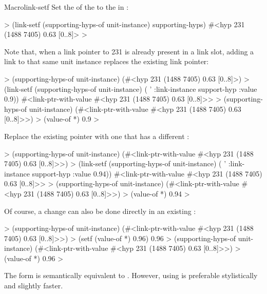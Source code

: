 \documentclass[10pt,twoside,english,pdftex]{article}
\begin{document}
\begin{functiondoc}{Macro}{link-setf}
\fnexamples
%
Set the   of the
  to the  in
:
%
\W\supp
\begin{example}
  > (link-setf (supporting-hyps-of unit-instance) supporting-hyps)
  #<hyp 231 (1488 7405) 0.63 [0..8]>
  >
\end{example}
%
Note that, when a link pointer to  231 is already present in
a link slot, adding a  link to that same  unit instance replaces the existing link pointer:
%
\W\supp\notpretop
\begin{example}
  > (supporting-hyps-of unit-instance)
  (#<hyp 231 (1488 7405) 0.63 [0..8]>)
  > (link-setf (supporting-hyps-of unit-instance) 
           ( '
               :link-instance support-hyp
               :value 0.9))
  #<link-ptr-with-value #<hyp 231 (1488 7405) 0.63 [0..8]>>
  > (supporting-hyps-of unit-instance)
  (#<link-ptr-with-value #<hyp 231 (1488 7405) 0.63 [0..8]>>)
  > (value-of *)
  0.9
  >
\end{example}
%
Replace the existing  pointer with one that has a different :
%
\W\supp\notpretop
\begin{example}
  > (supporting-hyps-of unit-instance)
  (#<link-ptr-with-value #<hyp 231 (1488 7405) 0.63 [0..8]>>)
  > (link-setf (supporting-hyps-of unit-instance) 
           ( '
               :link-instance support-hyp
               :value 0.94))
  #<link-ptr-with-value #<hyp 231 (1488 7405) 0.63 [0..8]>>
  > (supporting-hyps-of unit-instance)
  (#<link-ptr-with-value #<hyp 231 (1488 7405) 0.63 [0..8]>>)
  > (value-of *)
  0.94
  >
\end{example}
%
Of course, a  change can also be done directly in 
an existing :
%
\W\supp\notpretop
\begin{example}
  > (supporting-hyps-of unit-instance)
  (#<link-ptr-with-value #<hyp 231 (1488 7405) 0.63 [0..8]>>)
  > (setf (value-of *) 0.96)
  0.96
  > (supporting-hyps-of unit-instance)
  (#<link-ptr-with-value #<hyp 231 (1488 7405) 0.63 [0..8]>>)
  > (value-of *)
  0.96
  >
\end{example}

\fnnote {}%
The form 
is semantically equivalent to .  However, using
 is preferable stylistically and
slightly faster. 

\end{functiondoc}
\end{document}
